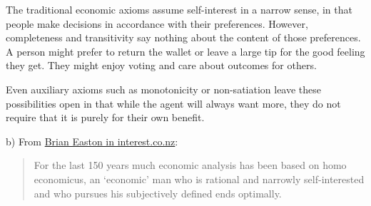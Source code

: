 \documentclass[
  letterpaper,
  DIV=11,
  numbers=noendperiod]{scrreprt}
\begin{document}
\begin{tcolorbox}[enhanced jigsaw, title=\textcolor{quarto-callout-tip-color}{\faLightbulb}\hspace{0.5em}{Answer}, toprule=.15mm, colback=white, breakable, titlerule=0mm, colframe=quarto-callout-tip-color-frame, coltitle=black, opacityback=0, rightrule=.15mm, colbacktitle=quarto-callout-tip-color!10!white, bottomtitle=1mm, opacitybacktitle=0.6, arc=.35mm, bottomrule=.15mm, toptitle=1mm, leftrule=.75mm, left=2mm]

The traditional economic axioms assume self-interest in a narrow sense,
in that people make decisions in accordance with their preferences.
However, completeness and transitivity say nothing about the content of
those preferences. A person might prefer to return the wallet or leave a
large tip for the good feeling they get. They might enjoy voting and
care about outcomes for others.

Even auxiliary axioms such as monotonicity or non-satiation leave these
possibilities open in that while the agent will always want more, they
do not require that it is purely for their own benefit.

\end{tcolorbox}

b) From
\href{https://www.interest.co.nz/public-policy/116603/economist-brian-easton-says-behavioural-economics-challenges-our-assumptions}{Brian
Easton in interest.co.nz}:

\begin{quote}
For the last 150 years much economic analysis has been based on homo
economicus, an `economic' man who is rational and narrowly
self-interested and who pursues his subjectively defined ends optimally.
\end{quote}
\end{document}
